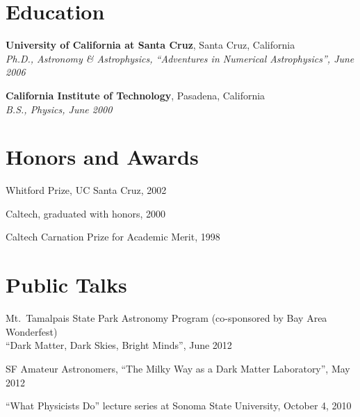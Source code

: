 \begin{resume}
\section{\sc Education}
\textbf{University of California at Santa Cruz}, Santa Cruz, California \\
{\em Ph.D., Astronomy \& Astrophysics, ``Adventures in Numerical Astrophysics'', June 2006}

\textbf{California Institute of Technology}, Pasadena, California \\
{\em B.S., Physics,  June 2000}


\section{\sc Honors and Awards} 
\begin{list1}
\item Whitford Prize, UC Santa Cruz, 2002
\item Caltech, graduated with honors, 2000
\item Caltech Carnation Prize for Academic Merit, 1998
\end{list1}


\section{\sc Public Talks}
\begin{list1}
\item Mt.~Tamalpais State Park Astronomy Program (co-sponsored by Bay Area Wonderfest) \\ ``Dark Matter, Dark Skies, Bright Minds'', June 2012

\item SF Amateur Astronomers, ``The Milky Way as a Dark Matter Laboratory'', May 2012

\item ``What Physicists Do'' lecture series at Sonoma State University, October 4, 2010
\end{list1}

\end{resume}


